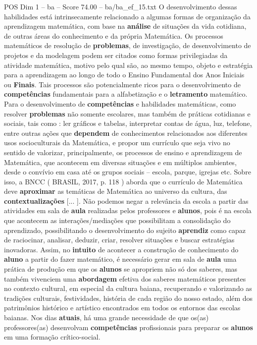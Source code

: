 \begin{textsample}{POS Dim 1 – ba – Score 74.00 – ba/ba\_ef\_15.txt}
O desenvolvimento dessas habilidades está intrinsecamente relacionado a algumas formas de organização da aprendizagem matemática, com base na \textbf{análise} de situações da vida cotidiana, de outras áreas do conhecimento e da própria Matemática.
Os processos matemáticos de resolução de \textbf{problemas}, de investigação, de desenvolvimento de projetos e da modelagem podem ser citados como formas privilegiadas da atividade matemática, motivo pelo qual são, ao mesmo tempo, objeto e estratégia para a aprendizagem ao longo de todo o Ensino Fundamental dos Anos Iniciais ou \textbf{Finais}.
Tais processos são potencialmente ricos para o desenvolvimento de \textbf{competências} fundamentais para a alfabetização e o \textbf{letramento} matemático.
Para o desenvolvimento de \textbf{competências} e habilidades matemáticas, como resolver \textbf{problemas} não somente escolares, mas também de práticas cotidianas e sociais, tais como : ler gráficos e tabelas, interpretar contas de água, luz, telefone, entre outras ações que \textbf{dependem} de conhecimentos relacionados aos diferentes usos socioculturais da Matemática, e propor um currículo que seja vivo no sentido de valorizar, principalmente, os processos de ensino e aprendizagem de Matemática, que acontecem em diversas situações e em múltiplos ambientes, desde o convívio em casa até os grupos sociais – escola, parque, igrejas etc.
Sobre isso, a BNCC ( BRASIL, 2017, p. 118 ) aborda que o currículo de Matemática deve \textbf{aproximar} as temáticas de Matemática ao universo da cultura, das \textbf{contextualizações} [... ].
Não podemos negar a relevância da escola a partir das atividades em sala de \textbf{aula} realizadas pelos professores e \textbf{alunos}, pois é na escola que acontecem as interações/mediações que possibilitam a consolidação do aprendizado, possibilitando o desenvolvimento do sujeito \textbf{aprendiz} como capaz de raciocinar, analisar, deduzir, criar, resolver situações e buscar estratégias inovadoras.
Assim, no \textbf{intuito} de acontecer a construção de conhecimento do \textbf{aluno} a partir do fazer matemático, é necessário gerar em sala de \textbf{aula} uma prática de produção em que os \textbf{alunos} se apropriem não só dos saberes, mas também vivenciem uma \textbf{abordagem} efetiva dos saberes matemáticos presentes no contexto cultural, em especial da cultura baiana, recuperando e valorizando as tradições culturais, festividades, história de cada região do nosso estado, além dos patrimônios histórico e artístico encontrados em todos os entornos das escolas baianas.
Nos dias \textbf{atuais}, há uma grande necessidade de que os(as) professores(as) desenvolvam \textbf{competências} profissionais para preparar os \textbf{alunos} em uma formação crítico-social.

\end{textsample}
